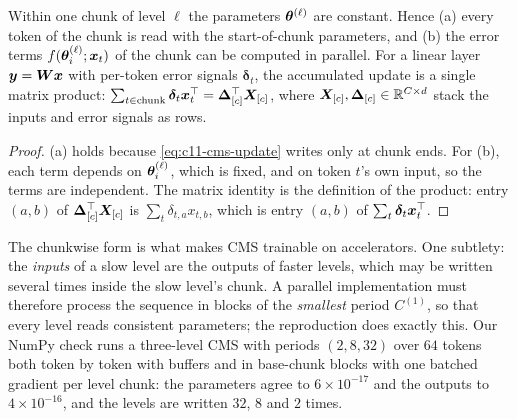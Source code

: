 \begin{proposition}\label{prop:c11-cms-chunk}
Within one chunk of level $\ell$ the parameters $\bm{\theta}^{(\ell)}$ are constant. Hence (a) every
token of the chunk is read with the start-of-chunk parameters, and (b) the error terms
$f(\bm{\theta}^{(\ell)}_i;\bm{x}_t)$ of the chunk can be computed in parallel. For a linear layer
$\bm{y} = \bm{W}\bm{x}$ with per-token error signals $\bm{\delta}_t$, the accumulated update is a single
matrix product: $\sum_{t\in\text{chunk}}\bm{\delta}_t\bm{x}_t^{\top} = \bm{\Delta}_{[c]}^{\top}\bm{X}_{[c]}$, where
$\bm{X}_{[c]}, \bm{\Delta}_{[c]} \in \mathbb{R}^{C\times d}$ stack the inputs and error signals as rows.
\end{proposition}
\begin{proof}
(a) holds because \cref{eq:c11-cms-update} writes only at chunk ends. For (b), each term depends on
$\bm{\theta}^{(\ell)}_i$, which is fixed, and on token $t$'s own input, so the terms are independent.
The matrix identity is the definition of the product: entry $(a,b)$ of $\bm{\Delta}_{[c]}^{\top}\bm{X}_{[c]}$
is $\sum_t\delta_{t,a}x_{t,b}$, which is entry $(a,b)$ of $\sum_t\bm{\delta}_t\bm{x}_t^{\top}$.
\end{proof}

The chunkwise form is what makes CMS trainable on accelerators. One subtlety: the \emph{inputs}
of a slow level are the outputs of faster levels, which may be written several times inside the
slow level's chunk. A parallel implementation must therefore process the sequence in blocks of
the \emph{smallest} period $C^{(1)}$, so that every level reads consistent parameters; the
reproduction does exactly this. Our NumPy check runs a three-level CMS with periods $(2, 8, 32)$
over $64$ tokens both token by token with buffers and in base-chunk blocks with one batched
gradient per level chunk: the parameters agree to $6\times10^{-17}$ and the outputs to
$4\times10^{-16}$, and the levels are written $32$, $8$ and $2$ times.

